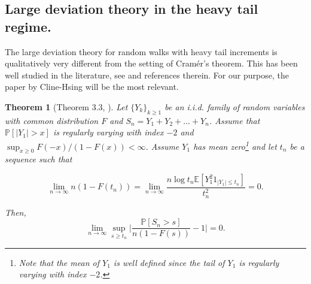 \documentclass[9pt,a4paper,reqno]{amsart}
\theoremstyle{mine}
\newtheorem{thm}{Theorem}[section]
\theoremstyle{definition}
\theoremstyle{remark}
\newcommand{\mb}{\mathbb}
\begin{document}
\subsection{Large deviation theory in the heavy tail regime.}
The large deviation theory for random walks with heavy tail increments is qualitatively very different from the setting of Cram\'er's theorem. This has been well studied in the literature, see \cites{SVNagaevLargedeviationsofsumsofrandomvariables,cline-hsing, Linnik-Ontheprobabilityoflargedeviationsforthesumofindependentvariables, Denisov-Dieker-Shneer-Largedeviationsforrandomwalksundersubexponentiality:thebig-jumpdomain, Mikosch-Embrechts-Claudia, Mikosch-Nagaev-Largedeviationsofheavytailedsumswithapplicationsininsurance, Heyde-Onlargedeviationprobabilitiesinthecaseofattractiontoanon-normalstablelaw, Heyde-Acontributiontothetheoryoflargedeviationsforsumsofindependentrandomvariables, Heyde-Onlargedeviationproblemsforsumsofrandomvariableswhicharenotattractedtothenormallaw, Nagaev-I, Nagaev-II} and references therein. For our purpose, the paper by Cline-Hsing \cite{cline-hsing} will be the most relevant. 

\begin{thm}[Theorem $3.3$, \cite{cline-hsing}] \label{main-use-result-cline-hsing}
    Let $\{Y_k\}_{k\geq 1}$ be an i.i.d. family of random variables with common distribution $F$ and $S_n = Y_1 + Y_2 + ...+ Y_n$. Assume that $\mb{P}[|Y_1| >x]$ is regularly varying with index $-2$ and $\sup_{x \geq 0} F(-x)/(1-F(x)) <\infty$. Assume $Y_1$ has mean zero\footnote{Note that the mean of $Y_1$ is well defined since the tail of $Y_1$ is regularly varying with index $-2$.} and let $t_n$ be a sequence such that 
    
    \[ \lim_{n\to \infty} n(1-F(t_n)) = \lim_{n\to \infty} \frac{n \log t_n \mb{E}[Y_1^2 1_{|Y_1| \leq t_n }]}{t_n^2}= 0.\]

Then, \[ \lim_{n\to \infty} \sup_{s \geq t_n} \biggl|\frac{\mb{P}[S_n >s]}{n (1 - F(s))} -1 \biggr| =0.\]
\end{thm}
\end{document}
